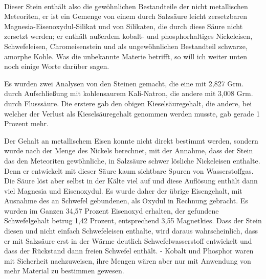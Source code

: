 \documentclass[a4paper, 11pt, oneside]{article}
\begin{document}
\paragraph{}
Dieser Stein enthält also die gewöhnlichen Bestandteile der nicht metallischen Meteoriten, er ist ein Gemenge von einem durch Salzsäure leicht zersetzbaren Magnesia-Eisenoxydul-Silikat und von Silikaten, die durch diese Säure nicht zersetzt werden; er enthält außerdem kobalt- und phosphorhaltiges Nickeleisen, Schwefeleisen, Chromeisenstein und als ungewöhnlichen Bestandteil schwarze, amorphe Kohle. Was die unbekannte Materie betrifft, so will ich weiter unten noch einige Worte darüber sagen.

Es wurden zwei Analysen von den Steinen gemacht, die eine mit 2,827 Grm. durch Aufschließung mit kohlensaurem Kali-Natron, die andere mit 3,008 Grm. durch Flusssäure. Die erstere gab den obigen Kieselsäuregehalt, die andere, bei welcher der Verlust als Kieselsäuregehalt genommen werden musste, gab gerade 1 Prozent mehr.

Der Gehalt an metallischem Eisen konnte nicht direkt bestimmt werden, sondern wurde nach der Menge des Nickels berechnet, mit der Annahme, dass der Stein das den Meteoriten gewöhnliche, in Salzsäure schwer lösliche Nickeleisen enthalte. Denn er entwickelt mit dieser Säure kaum sichtbare Spuren von Wasserstoffgas. Die Säure löst aber selbst in der Kälte viel auf und diese Auflösung enthält dann viel Magnesia und Eisenoxydul. Es wurde daher der übrige Eisengehalt, mit Ausnahme des an Schwefel gebundenen, als Oxydul in Rechnung gebracht. Es wurden im Ganzen 34,57 Prozent Eisenoxyd erhalten, der gefundene Schwefelgehalt betrug 1,42 Prozent, entsprechend 3,55 Magnetkies. Dass der Stein diesen und nicht einfach Schwefeleisen enthalte, wird daraus wahrscheinlich, dass er mit Salzsäure erst in der Wärme deutlich Schwefelwasserstoff entwickelt und dass der Rückstand dann freien Schwefel enthält. - Kobalt und Phosphor waren mit Sicherheit nachzuweisen, ihre Mengen wären aber nur mit Anwendung von mehr Material zu bestimmen gewesen.
\end{document}
